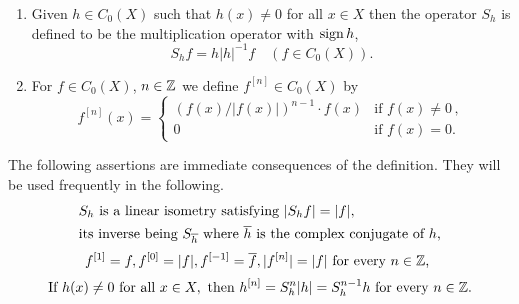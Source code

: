 	\begin{definition}\label{def:b3-2.2}
\begin{enumerate}[\upshape (i)]
		
\item
Given $h \in C_{0}(X)$ such that $h(x) \neq 0$ for all $x \in X$ then the operator $S_{h}$ is defined to be the multiplication operator with $ \operatorname{sign} h $, \ie
		\begin{equation}\label{eq:b3-2.3}
			S_{h}f = h|h|^{-1}f \quad (f \in C_{0}(X)).
		\end{equation}
		
\item
For $f \in C_{0}(X)$, $n \in \mathbb{Z}$ we define $f^{[n]} \in C_{0}(X)$ by
\begin{equation}\label{eq:b3-2.4}
	f^{[n]}(x) = 
	\begin{cases}
			(f(x)/|f(x)|)^{n-1}\cdot f(x) & \text{if } f(x) \neq 0\,,\\			
			0 & \text{if } f(x) = 0.
			\end{cases}
\end{equation}
\end{enumerate}
\end{definition}
The following assertions are immediate consequences of the definition. 
They will be used frequently in the following.
\begin{equation}\label{eq:b3-2.5}
	\begin{split}
		&S_{h} \text{  is a linear isometry satisfying  } |S_{h}f| = |f|, \\ 
		&\text{its inverse being  } S_{\overline{h}} \text{  where  } \overline{h} \text{ is the complex conjugate of $ h $,}
	\end{split}
\end{equation}
\begin{equation}\label{eq:b3-2.6}
	    f^{[1]} = f, f^{[0]} = |f|, f^{[-1]} = \overline{f}, |f^{[n]}| = |f| \text{  for every $n \in \mathbb{Z}$, }
\end{equation}
\begin{equation}\label{eq:b3-2.7}
	\text{If  } h(x) \neq 0 \text{  for all  } x \in X, \text{  then  } h^{[n]} = S_{h}^{n}|h| = S_{h}^{n-1}h
	\text{  for every $ n \in \mathbb{Z} $.} 
\end{equation}
